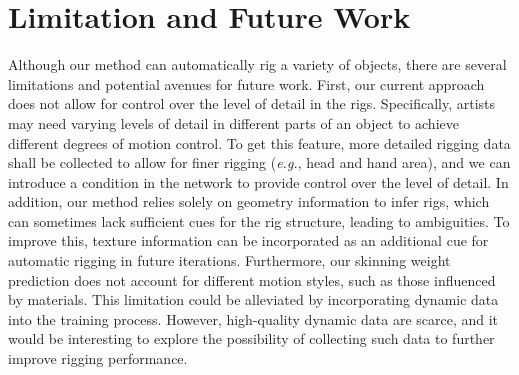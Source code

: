 \section{Limitation and Future Work}

Although our method can automatically rig a variety of objects, there are several limitations and potential avenues for future work.
% 
 First, our current approach does not allow for control over the level of detail in the rigs. Specifically, artists may need varying levels of detail in different parts of an object to achieve different degrees of motion control.
To get this feature, more detailed rigging data shall be collected to allow for finer rigging (\textit{e.g.}, head and hand area), and we can introduce a condition in the network to provide control over the level of detail.
% 
In addition, our method relies solely on geometry information to infer rigs, which can sometimes lack sufficient cues for the rig structure, leading to ambiguities. To improve this, texture information can be incorporated as an additional cue for automatic rigging in future iterations.
% 
Furthermore, our skinning weight prediction does not account for different motion styles, such as those influenced by materials. This limitation could be alleviated by incorporating dynamic data into the training process. However, high-quality dynamic data are scarce, and it would be interesting to explore the possibility of collecting such data to further improve rigging performance.